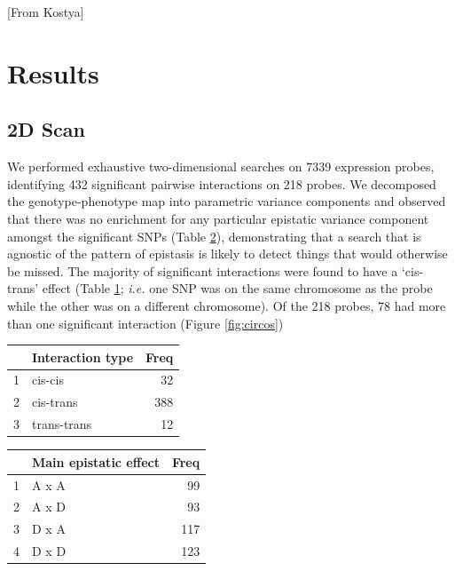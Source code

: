 \documentclass[paper=a4, fontsize=11pt]{scrartcl}	%
\numberwithin{equation}{section}									%
\numberwithin{figure}{section}										%
\numberwithin{table}{section}										%
\begin{document}
[From Kostya]

\section{Results}

\subsection{2D Scan}

We performed exhaustive two-dimensional searches on 7339 expression probes, identifying 432 significant pairwise interactions on 218 probes. We decomposed the genotype-phenotype map into parametric variance components and observed that there was no enrichment for any particular epistatic variance component amongst the significant SNPs (Table \ref{tab:vc}), demonstrating that a search that is agnostic of the pattern of epistasis is likely to detect things that would otherwise be missed. The majority of significant interactions were found to have a `cis-trans' effect (Table \ref{tab:type}; \emph{i.e.} one SNP was on the same chromosome as the probe while the other was on a different chromosome). Of the 218 probes, 78 had more than one significant interaction (Figure \ref{fig:circos})


\begin{table}[ht]
	\centering
	\begin{tabular}{rlr}
		\hline
		& Interaction type & Freq \\ 
		\hline
		1 & cis-cis &  32 \\ 
		2 & cis-trans & 388 \\ 
		3 & trans-trans &  12 \\ 
		\hline
	\end{tabular}
	\label{tab:type}
\end{table}

\begin{table}[ht]
	\centering
	\begin{tabular}{rlr}
		\hline
		& Main epistatic effect & Freq \\ 
		\hline
		1 & A x A &  99 \\ 
		2 & A x D &  93 \\ 
		3 & D x A & 117 \\ 
		4 & D x D & 123 \\ 
		\hline
	\end{tabular}
	\label{tab:vc}
\end{table}
\end{document}
